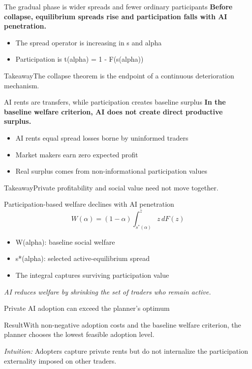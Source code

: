 \documentclass[10pt]{mycool}
\begin{document}
\begin{frame}{The gradual phase is wider spreads and fewer ordinary participants}
\textbf{Before collapse, equilibrium spreads rise and participation falls with AI penetration.}
\begin{itemize}
  \item The spread operator is increasing in s and alpha
  \item Participation is t(alpha) = 1 - F(s(alpha))
\end{itemize}
\begin{block}{Takeaway}The collapse theorem is the endpoint of a continuous deterioration mechanism.\end{block}
\end{frame}

\begin{frame}{AI rents are transfers, while participation creates baseline surplus}
\textbf{In the baseline welfare criterion, AI does not create direct productive surplus.}
\begin{itemize}
  \item AI rents equal spread losses borne by uninformed traders
  \item Market makers earn zero expected profit
  \item Real surplus comes from non-informational participation values
\end{itemize}
\begin{block}{Takeaway}Private profitability and social value need not move together.\end{block}
\end{frame}

\begin{frame}{Participation-based welfare declines with AI penetration}
\begin{equation*}W(\alpha) = (1-\alpha) \int_{s^*(\alpha)}^{\bar z} z \,dF(z)\end{equation*}
\begin{itemize}
  \item W(alpha): baseline social welfare
  \item s*(alpha): selected active-equilibrium spread
  \item The integral captures surviving participation value
\end{itemize}
\textit{AI reduces welfare by shrinking the set of traders who remain active.}
\end{frame}

\begin{frame}{Private AI adoption can exceed the planner's optimum}
\begin{block}{Result}With non-negative adoption costs and the baseline welfare criterion, the planner chooses the lowest feasible adoption level.\end{block}
\textit{Intuition:} Adopters capture private rents but do not internalize the participation externality imposed on other traders.
\end{frame}
\end{document}
